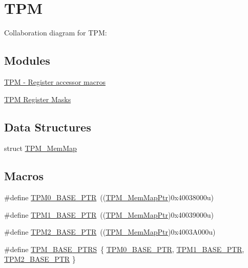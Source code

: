 \hypertarget{group___t_p_m___peripheral}{}\section{T\+PM}
\label{group___t_p_m___peripheral}
Collaboration diagram for T\+PM\+:
\subsection*{Modules}
\begin{DoxyCompactItemize}
\item 
\hyperlink{group___t_p_m___register___accessor___macros}{T\+P\+M -\/ Register accessor macros}
\item 
\hyperlink{group___t_p_m___register___masks}{T\+P\+M Register Masks}
\end{DoxyCompactItemize}
\subsection*{Data Structures}
\begin{DoxyCompactItemize}
\item 
struct \hyperlink{struct_t_p_m___mem_map}{T\+P\+M\+\_\+\+Mem\+Map}
\end{DoxyCompactItemize}
\subsection*{Macros}
\begin{DoxyCompactItemize}
\item 
\#define \hyperlink{group___t_p_m___peripheral_ga8ba6c6fb69345639750108c3289a24c4}{T\+P\+M0\+\_\+\+B\+A\+S\+E\+\_\+\+P\+TR}~((\hyperlink{group___t_p_m___peripheral_ga32147338cedc9904efff0d19b3a358ac}{T\+P\+M\+\_\+\+Mem\+Map\+Ptr})0x40038000u)
\item 
\#define \hyperlink{group___t_p_m___peripheral_ga3c3f533f8c87c74f2bbc3a4de83d1181}{T\+P\+M1\+\_\+\+B\+A\+S\+E\+\_\+\+P\+TR}~((\hyperlink{group___t_p_m___peripheral_ga32147338cedc9904efff0d19b3a358ac}{T\+P\+M\+\_\+\+Mem\+Map\+Ptr})0x40039000u)
\item 
\#define \hyperlink{group___t_p_m___peripheral_ga37cc120e7475fb646fe9bc15b57f06bc}{T\+P\+M2\+\_\+\+B\+A\+S\+E\+\_\+\+P\+TR}~((\hyperlink{group___t_p_m___peripheral_ga32147338cedc9904efff0d19b3a358ac}{T\+P\+M\+\_\+\+Mem\+Map\+Ptr})0x4003\+A000u)
\item 
\#define \hyperlink{group___t_p_m___peripheral_ga1d61ed554c056d8f63d1dbcc7ce05e62}{T\+P\+M\+\_\+\+B\+A\+S\+E\+\_\+\+P\+T\+RS}~\{ \hyperlink{group___t_p_m___peripheral_ga8ba6c6fb69345639750108c3289a24c4}{T\+P\+M0\+\_\+\+B\+A\+S\+E\+\_\+\+P\+TR}, \hyperlink{group___t_p_m___peripheral_ga3c3f533f8c87c74f2bbc3a4de83d1181}{T\+P\+M1\+\_\+\+B\+A\+S\+E\+\_\+\+P\+TR}, \hyperlink{group___t_p_m___peripheral_ga37cc120e7475fb646fe9bc15b57f06bc}{T\+P\+M2\+\_\+\+B\+A\+S\+E\+\_\+\+P\+TR} \}
\end{DoxyCompactItemize}
